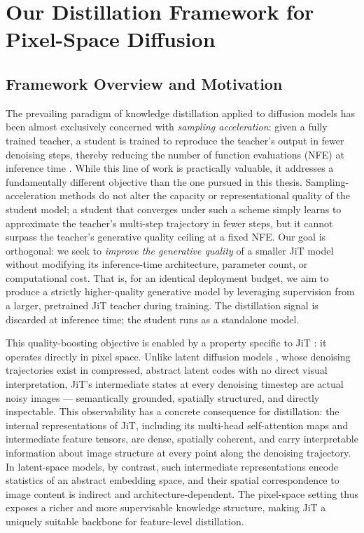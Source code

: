 \chapter{Our Distillation Framework for Pixel-Space Diffusion}
\label{chap:framework}

\section{Framework Overview and Motivation}
\label{sec:framework_overview}

The prevailing paradigm of knowledge distillation applied to diffusion models has been almost exclusively concerned with \emph{sampling acceleration}: given a fully trained teacher, a student is trained to reproduce the teacher's output in fewer denoising steps, thereby reducing the number of function evaluations (NFE) at inference time \cite{salimans2022progressive, song2023consistency, luo2023lcm}. While this line of work is practically valuable, it addresses a fundamentally different objective than the one pursued in this thesis. Sampling-acceleration methods do not alter the capacity or representational quality of the student model; a student that converges under such a scheme simply learns to approximate the teacher's multi-step trajectory in fewer steps, but it cannot surpass the teacher's generative quality ceiling at a fixed NFE. Our goal is orthogonal: we seek to \emph{improve the generative quality} of a smaller JiT model without modifying its inference-time architecture, parameter count, or computational cost. That is, for an identical deployment budget, we aim to produce a strictly higher-quality generative model by leveraging supervision from a larger, pretrained JiT teacher during training. The distillation signal is discarded at inference time; the student runs as a standalone model.

This quality-boosting objective is enabled by a property specific to JiT \cite{li2025jit}: it operates directly in pixel space. Unlike latent diffusion models \cite{rombach2022latent}, whose denoising trajectories exist in compressed, abstract latent codes with no direct visual interpretation, JiT's intermediate states at every denoising timestep are actual noisy images — semantically grounded, spatially structured, and directly inspectable. This observability has a concrete consequence for distillation: the internal representations of JiT, including its multi-head self-attention maps and intermediate feature tensors, are dense, spatially coherent, and carry interpretable information about image structure at every point along the denoising trajectory. In latent-space models, by contrast, such intermediate representations encode statistics of an abstract embedding space, and their spatial correspondence to image content is indirect and architecture-dependent. The pixel-space setting thus exposes a richer and more supervisable knowledge structure, making JiT a uniquely suitable backbone for feature-level distillation.

